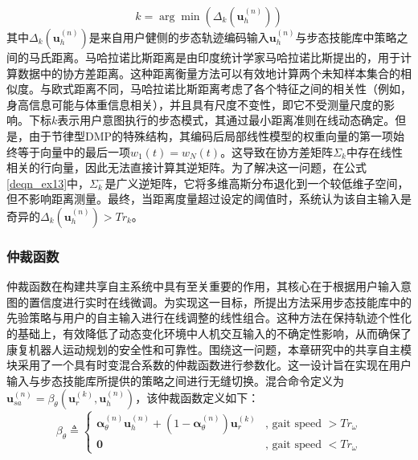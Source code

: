 \begin{equation}
  \label{deqn_ex14}
  k = \arg \min \left( {{\Delta _k}({\pmb{u}}_h^{(n)})} \right)
\end{equation}
其中${\Delta _k}(\pmb{u}_h^{(n)})$是来自用户健侧的步态轨迹编码输入${\pmb{u}}_h^{(n)}$与步态技能库中策略之间的马氏距离。马哈拉诺比斯距离是由印度统计学家马哈拉诺比斯提出的，用于计算数据中的协方差距离。这种距离衡量方法可以有效地计算两个未知样本集合的相似度。与欧式距离不同，马哈拉诺比斯距离考虑了各个特征之间的相关性（例如，身高信息可能与体重信息相关），并且具有尺度不变性，即它不受测量尺度的影响。下标$k$表示用户意图执行的步态模式，其通过最小距离准则在线动态确定。但是，由于节律型DMP的特殊结构，其编码后局部线性模型的权重向量的第一项始终等于向量中的最后一项${w_1}(t)={w_N}(t)$。这导致在协方差矩阵${\Sigma _k}$中存在线性相关的行向量，因此无法直接计算其逆矩阵。为了解决这一问题，在公式\ref{deqn_ex13}中，$\Sigma_k^-$是广义逆矩阵，它将多维高斯分布退化到一个较低维子空间，但不影响距离测量。最终，当距离度量超过设定的阈值时，系统认为该自主输入是奇异的${\Delta _k}(\pmb{u}_h^{(n)}) > T{r_k}$。  

\subsubsection{仲裁函数}仲裁函数在构建共享自主系统中具有至关重要的作用，其核心在于根据用户输入意图的置信度进行实时在线微调。为实现这一目标，所提出方法采用步态技能库中的先验策略与用户的自主输入进行在线调整的线性组合。这种方法在保持轨迹个性化的基础上，有效降低了动态变化环境中人机交互输入的不确定性影响，从而确保了康复机器人运动规划的安全性和可靠性。围绕这一问题，本章研究中的共享自主模块采用了一个具有时变混合系数的仲裁函数进行参数化。这一设计旨在实现在用户输入与步态技能库所提供的策略之间进行无缝切换。混合命令定义为${\pmb{u}}_{sa}^{(n)} = {\beta _\theta }({\pmb{u}}_r^{(k)},{\pmb{u}}_h^{(n)})$，该仲裁函数定义如下：
\begin{equation}
  \label{deqn_ex15}
  {\beta _\theta } \triangleq \left \{  {\begin{array}{*{20}{c}}
    {\pmb{\alpha }_\theta ^{(n)}{\pmb{u}}_h^{(n)} + \left( {1 - {\boldsymbol{\alpha }}_\theta ^{(n)}} \right){\pmb{u}}_r^{(k)}}&{{\text{, gait speed }}\pmb{ >  }T{r_\omega }}  \\  
    \pmb{0}&{{\text{, gait speed }}\pmb{ <  }T{r_\omega }} 
  \end{array}} \right.
\end{equation}

